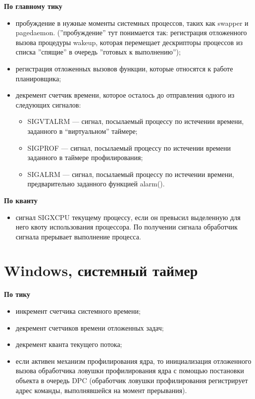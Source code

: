 \documentclass[a4paper,14pt,russian]{extreport}
\begin{document}
	\textbf{По главному тику}
	\begin{itemize}
		\item пробуждение в нужные моменты системных процессов, таких как swapper и pagedaemon. (”пробуждение” тут понимается так: регистрация отложенного вызова процедуры wakeup, которая перемещает дескрипторы процессов из списка ”спящие” в очередь ”готовых к выполнению”);
		\item регистрация отложенных вызовов функции, которые относятся к работе планировщика;
		\item декремент счетчик времени, которое осталось до отправления одного из следующих сигналов:
		\begin{itemize}
			\item SIGVTALRM --- сигнал, посылаемый процессу по истечении времени, заданного в “виртуальном” таймере;
			\item SIGPROF --- сигнал, посылаемый процессу по истечении времени заданного в таймере профилирования;
			\item SIGALRM --- сигнал, посылаемый процессу по истечении времени, предварительно заданного функцией alarm().
		\end{itemize}
	\end{itemize}

	\textbf{По кванту}
	\begin{itemize}
		\item  сигнал SIGXCPU текущему процессу, если он превысил выделенную для него квоту использования процессора. По получении сигнала обработчик сигнала прерывает выполнение процесса.
	\end{itemize}

	\section{Windows, системный таймер}
	
	\textbf{По тику}
	\begin{itemize}
    	\item инкремент счетчика системного времени;
    	\item декремент счетчиков времени отложенных задач;
    	\item декремент кванта текущего потока;
    	\item если активен механизм профилирования ядра, то инициализация отложенного вызова обработчика ловушки профилирования ядра с помощью постановки объекта в очередь DPC (обработчик ловушки профилирования регистрирует адрес команды, выполнявшейся на момент прерывания).
	\end{itemize}
\end{document}

